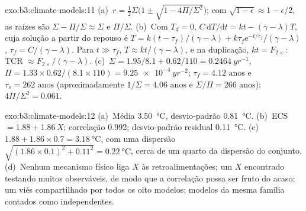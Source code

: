 \begin{solution}{exo:b3:climate-models:11}
(a)~$r = \tfrac12\Sigma\big(1 \pm \sqrt{1 - 4\Pi/\Sigma^2}\big)$; com
$\sqrt{1 - \epsilon} \approx 1 - \epsilon/2$, as raízes são $\Sigma -
\Pi/\Sigma \approx \Sigma$ e $\Pi/\Sigma$. (b)~Com $T_d = 0$, $C\,\mathrm
dT/\mathrm dt = kt - (\gamma - \lambda)T$, cuja solução a partir do repouso é $T =
k(t - \tau_f)/(\gamma - \lambda) + k\tau_f\mathrm e^{-t/\tau_f}/(\gamma -
\lambda)$, $\tau_f = C/(\gamma - \lambda)$. Para $t \gg \tau_f$, $T \approx
kt/(\gamma - \lambda)$, e na duplicação, $kt = F_{2\times}$: TCR
$\approx F_{2\times}/(\gamma - \lambda)$. (c)~$\Sigma = 1.95/8.1 +
0.62/110 = \qty{0.2464}{yr^{-1}}$, $\Pi = 1.33\times0.62/(8.1\times110) =
\qty{9.25e-4}{yr^{-2}}$; $\tau_f = \num{4.12}\text{ anos}$ e $\tau_s =
\num{262}\text{ anos}$ (aproximadamente $1/\Sigma = \num{4.06}\text{ anos}$ e
$\Sigma/\Pi = \num{266}\text{ anos}$); $4\Pi/\Sigma^2 = 0.061$.
\end{solution}

\begin{solution}{exo:b3:climate-models:12}
(a)~Média \qty{3.50}{\celsius}, desvio-padrão \qty{0.81}{\celsius}.
(b)~ECS $= 1.88 + 1.86\,X$; correlação \num{0.992}; desvio-padrão
residual \qty{0.11}{\celsius}. (c)~$1.88 + 1.86\times0.7 =
\qty{3.18}{\celsius}$, com uma dispersão $\sqrt{(1.86\times0.1)^2 + 0.11^2} =
\qty{0.22}{\celsius}$, cerca de um quarto da dispersão do conjunto.
(d)~Nenhum mecanismo físico liga $X$ às retroalimentações; um $X$ encontrado
testando muitos observáveis, de modo que a correlação possa ser fruto do acaso; um viés
compartilhado por todos os oito modelos; modelos da mesma família contados como
independentes.
\end{solution}

